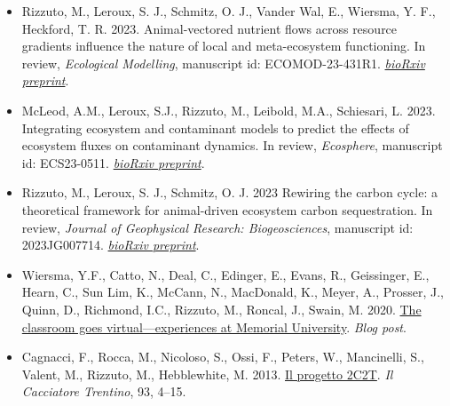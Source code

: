 
\begin{itemize}
  \item \textcolor{awesome}{Rizzuto, M.}, Leroux, S. J., Schmitz, O. J., Vander Wal, E., Wiersma, Y. F., Heckford, T. R. 2023. Animal-vectored nutrient flows across resource gradients influence the nature of local and meta-ecosystem functioning. In review, \emph{Ecological Modelling}, manuscript id: ECOMOD-23-431R1. \href{https://doi.org/10.1101/2023.03.03.530982}{\emph{bioRxiv preprint}}. 
  \item McLeod, A.M., Leroux, S.J., \textcolor{awesome}{Rizzuto, M.}, Leibold, M.A., Schiesari, L. 2023. Integrating ecosystem and contaminant models to predict the effects of ecosystem fluxes on contaminant dynamics. In review, \emph{Ecosphere}, manuscript id: ECS23-0511. \href{https://doi.org/10.1101/2023.07.15.549171}{\emph{bioRxiv preprint}}.
  \item \textcolor{awesome}{Rizzuto, M.}, Leroux, S. J., Schmitz, O. J. 2023 Rewiring the carbon cycle: a theoretical framework for animal-driven ecosystem carbon sequestration. In review, \emph{Journal of Geophysical Research: Biogeosciences}, manuscript id: 2023JG007714. \href{https://doi.org/10.1101/2023.07.14.549071}{\emph{bioRxiv preprint}}.
\end{itemize}


\begin{itemize}
  \item Wiersma, Y.F., Catto, N., Deal, C., Edinger, E., Evans, R., Geissinger, E., Hearn, C., Sun Lim, K., McCann, N., MacDonald, K., Meyer, A., Prosser, J., Quinn, D., Richmond, I.C., \textcolor{awesome}{Rizzuto, M.}, Roncal, J., Swain, M. 2020. \href{https://nllandscapeecology.com/blog-post-teaching-and-learning-remotely-time-to-read-4-min-45-s/}{The classroom goes virtual---experiences at Memorial University}. \emph{Blog post}.
  \item Cagnacci, F., Rocca, M., Nicoloso, S., Ossi, F., Peters, W., Mancinelli, S., Valent, M., \textcolor{awesome}{Rizzuto, M.}, Hebblewhite, M. 2013. \href{https://en.calameo.com/read/00214567355b1384f96d0}{Il progetto 2C2T}. \emph{Il Cacciatore Trentino}, 93, 4--15.
\end{itemize}


  


  
